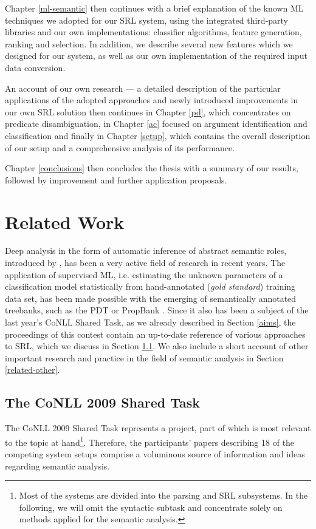 \documentclass[12pt,notitlepage]{report}
\begin{document}
Chapter \ref{ml-semantic} then continues with a brief explanation of the known ML techniques we adopted for our SRL system, using the integrated third-party libraries and our own implementations: classifier algorithms, feature generation, ranking and selection. In addition, we describe several new features which we designed for our system, as well as our own implementation of the required input data conversion.

An account of our own research --- a detailed description of the particular applications of the adopted approaches and newly introduced improvements in our own SRL solution then continues in Chapter \ref{pd}, which concentrates on predicate disambiguation, in Chapter \ref{ac} focused on argument identification and classification and finally in Chapter \ref{setup}, which contains the overall description of our setup and a comprehensive analysis of its performance.

Chapter \ref{conclusions} then concludes the thesis with a summary of our results, followed by improvement and further application proposals.

%
%
\chapter{Related Work}\label{related}
%
%

Deep analysis in the form of automatic inference of abstract semantic roles, introduced by \citet{gildea02}, has been a very active field of research in recent years. The application of supervised ML, i.e. estimating the unknown parameters of a classification model statistically from hand-annotated (\emph{gold standard}) training data set, has been made possible with the emerging of semantically annotated treebanks, such as the PDT \citep{hajic06} or PropBank \citep{palmer05}. Since it also has been a subject of the last year's CoNLL Shared Task, as we already described in Section \ref{aims}, the proceedings of this contest contain an up-to-date reference of various approaches to SRL, which we discuss in Section \ref{conll2009}. We also include a short account of other important research and practice in the field of semantic analysis in Section \ref{related-other}.

\section{The CoNLL 2009 Shared Task}\label{conll2009}

The CoNLL 2009 Shared Task represents a project, part of which is most relevant to the topic at hand\footnote{Most of the systems are divided into the parsing and SRL subsystems. In the following, we will omit the syntactic subtask and concentrate solely on methods applied for the semantic analysis.}. Therefore, the participants' papers describing 18 of the competing system setups comprise a voluminous source of information and ideas regarding semantic analysis. 
\end{document}
